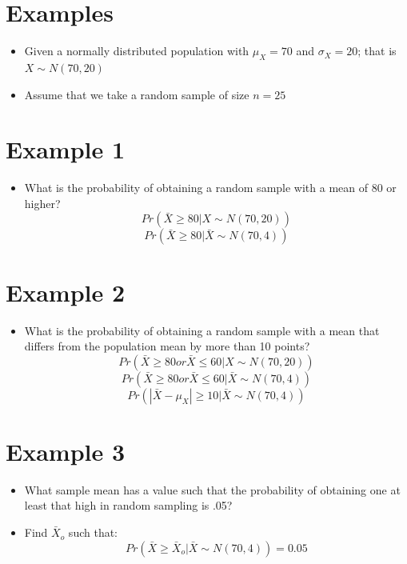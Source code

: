 \documentclass[12pt]{article}
\begin{document}
\section{Examples}\label{examples}

\begin{itemize}
\itemsep1pt\parskip0pt
\item
  Given a normally distributed population with \(\mu_{X} = 70\) and
  \(\sigma_{X} = 20\); that is \(X \sim N(70, 20)\)
\item
  Assume that we take a random sample of size \(n = 25\)
\end{itemize}

\section{Example 1}\label{example-1}

\begin{itemize}
\itemsep1pt\parskip0pt
\item
  What is the probability of obtaining a random sample with a mean of 80
  or higher? \[ Pr (\bar{X} \geq 80 | X \sim N(70, 20)) \]
  \[ Pr (\bar{X} \geq 80 | \bar{X} \sim N(70, 4)) \]
\end{itemize}

\section{Example 2}\label{example-2}

\begin{itemize}
\itemsep1pt\parskip0pt
\item
  What is the probability of obtaining a random sample with a mean that
  differs from the population mean by more than 10 points?
  \[ Pr (\bar{X} \geq 80 or \bar{X} \leq 60 | X \sim N(70, 20)) \]
  \[ Pr (\bar{X} \geq 80 or \bar{X} \leq 60 | \bar{X} \sim N(70, 4)) \]
  \[ Pr (|\bar{X} - \mu_{X}| \geq 10 | \bar{X} \sim N(70, 4)) \]
\end{itemize}

\section{Example 3}\label{example-3}

\begin{itemize}
\itemsep1pt\parskip0pt
\item
  What sample mean has a value such that the probability of obtaining
  one at least that high in random sampling is .05?
\item
  Find \(\bar{X}_{o}\) such that:
  \[ Pr (\bar{X} \geq \bar{X}_{o} | \bar{X} \sim N(70, 4)) = 0.05 \]
\end{itemize}
\end{document}
